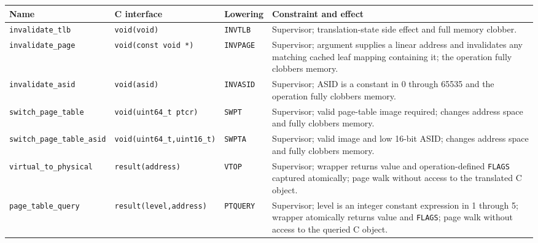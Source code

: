 \begingroup\footnotesize
\setlength{\tabcolsep}{2pt}
\begin{longtable}{@{}p{1.4in}p{1.35in}p{0.75in}p{2.1in}@{}}
\toprule
\textbf{Name} & \textbf{C interface} & \textbf{Lowering} & \textbf{Constraint and effect}\\
\midrule
\endhead
\texttt{invalidate\_tlb} & \texttt{void(void)} & \texttt{INVTLB} & Supervisor; translation-state side effect and full memory clobber.\\
\texttt{invalidate\_page} & \texttt{void(const void *)} & \texttt{INVPAGE} & Supervisor; argument supplies a linear address and invalidates any matching cached leaf mapping containing it; the operation fully clobbers memory.\\
\texttt{invalidate\_asid} & \texttt{void(asid)} & \texttt{INVASID} & Supervisor; ASID is a constant in 0 through 65535 and the operation fully clobbers memory.\\
\texttt{switch\_page\_table} & \texttt{void(uint64\_t ptcr)} & \texttt{SWPT} & Supervisor; valid page-table image required; changes address space and fully clobbers memory.\\
\texttt{switch\_page\_table\_asid} & \texttt{void(uint64\_t,uint16\_t)} & \texttt{SWPTA} & Supervisor; valid image and low 16-bit ASID; changes address space and fully clobbers memory.\\
\texttt{virtual\_to\_physical} & \texttt{result(address)} & \texttt{VTOP} & Supervisor; wrapper returns value and operation-defined \texttt{FLAGS} captured atomically; page walk without access to the translated C object.\\
\texttt{page\_table\_query} & \texttt{result(level,address)} & \texttt{PTQUERY} & Supervisor; level is an integer constant expression in 1 through 5; wrapper atomically returns value and \texttt{FLAGS}; page walk without access to the queried C object.\\
\bottomrule
\end{longtable}
\endgroup
